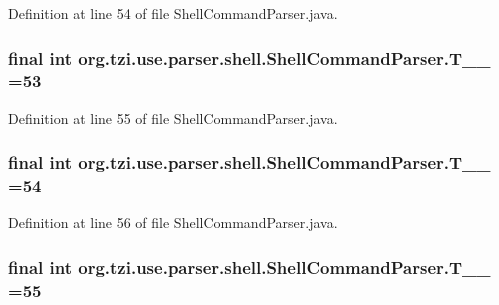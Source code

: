 Definition at line 54 of file Shell\-Command\-Parser.\-java.

\hypertarget{classorg_1_1tzi_1_1use_1_1parser_1_1shell_1_1_shell_command_parser_af3d1acb385202c4ef191cf2f9d807294}{
\subsubsection[{T\-\_\-\-\_\-53}]{\setlength{\rightskip}{0pt plus 5cm}final int org.\-tzi.\-use.\-parser.\-shell.\-Shell\-Command\-Parser.\-T\-\_\-\-\_ =53\hspace{0.3cm}{\ttfamily [static]}}}\label{classorg_1_1tzi_1_1use_1_1parser_1_1shell_1_1_shell_command_parser_af3d1acb385202c4ef191cf2f9d807294}


Definition at line 55 of file Shell\-Command\-Parser.\-java.

\hypertarget{classorg_1_1tzi_1_1use_1_1parser_1_1shell_1_1_shell_command_parser_a6aee1442e48cdf20827e00f5b0945180}{
\subsubsection[{T\-\_\-\-\_\-54}]{\setlength{\rightskip}{0pt plus 5cm}final int org.\-tzi.\-use.\-parser.\-shell.\-Shell\-Command\-Parser.\-T\-\_\-\-\_ =54\hspace{0.3cm}{\ttfamily [static]}}}\label{classorg_1_1tzi_1_1use_1_1parser_1_1shell_1_1_shell_command_parser_a6aee1442e48cdf20827e00f5b0945180}


Definition at line 56 of file Shell\-Command\-Parser.\-java.

\hypertarget{classorg_1_1tzi_1_1use_1_1parser_1_1shell_1_1_shell_command_parser_ae244d5e7c088b6ea703fa290d8dfca58}{
\subsubsection[{T\-\_\-\-\_\-55}]{\setlength{\rightskip}{0pt plus 5cm}final int org.\-tzi.\-use.\-parser.\-shell.\-Shell\-Command\-Parser.\-T\-\_\-\-\_ =55\hspace{0.3cm}{\ttfamily [static]}}}\label{classorg_1_1tzi_1_1use_1_1parser_1_1shell_1_1_shell_command_parser_ae244d5e7c088b6ea703fa290d8dfca58}


